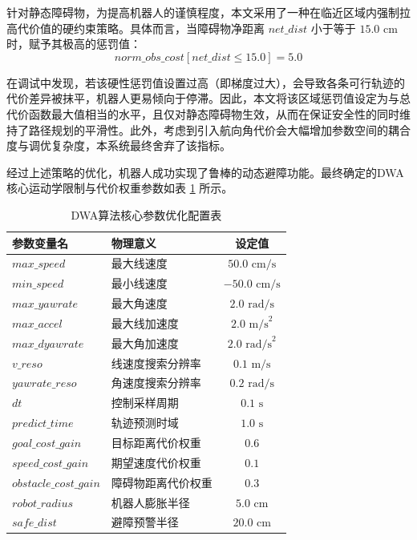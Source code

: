 \documentclass[
  oneside,
  degree=bachelor,
  fullwidthstop=false,
  fontset=fandol,
  times=false,
  minted=true,
  biblatex=true,
]{tongjithesis}
\begin{document}
针对静态障碍物，为提高机器人的谨慎程度，本文采用了一种在临近区域内强制拉高代价值的硬约束策略。具体而言，当障碍物净距离 $net\_dist$ 小于等于 $15.0\text{ cm}$ 时，赋予其极高的惩罚值：
\begin{equation}
norm\_obs\_cost[net\_dist \le 15.0] = 5.0
\end{equation}

在调试中发现，若该硬性惩罚值设置过高（即梯度过大），会导致各条可行轨迹的代价差异被抹平，机器人更易倾向于停滞。因此，本文将该区域惩罚值设定为与总代价函数最大值相当的水平，且仅对静态障碍物生效，从而在保证安全性的同时维持了路径规划的平滑性。此外，考虑到引入航向角代价会大幅增加参数空间的耦合度与调优复杂度，本系统最终舍弃了该指标。

经过上述策略的优化，机器人成功实现了鲁棒的动态避障功能。最终确定的DWA核心运动学限制与代价权重参数如表 \ref{tab:dwa_params} 所示。

\begin{table}[H]
    \centering
    \caption{DWA算法核心参数优化配置表}
    \label{tab:dwa_params}
    \begin{tabular}{llc}
        \toprule
        \textbf{参数变量名} & \textbf{物理意义} & \textbf{设定值} \\
        \midrule
        $max\_speed$ & 最大线速度 & $50.0 \text{ cm/s}$ \\
        $min\_speed$ & 最小线速度 & $-50.0 \text{ cm/s}$ \\
        $max\_yawrate$ & 最大角速度 & $2.0 \text{ rad/s}$ \\
        $max\_accel$ & 最大线加速度 & $2.0 \text{ m/s}^2$ \\
        $max\_dyawrate$ & 最大角加速度 & $2.0 \text{ rad/s}^2$ \\
        $v\_reso$ & 线速度搜索分辨率 & $0.1 \text{ m/s}$ \\
        $yawrate\_reso$ & 角速度搜索分辨率 & $0.2 \text{ rad/s}$ \\
        $dt$ & 控制采样周期 & $0.1 \text{ s}$ \\
        $predict\_time$ & 轨迹预测时域 & $1.0 \text{ s}$ \\
        $goal\_cost\_gain$ & 目标距离代价权重 & $0.6$ \\
        $speed\_cost\_gain$ & 期望速度代价权重 & $0.1$ \\
        $obstacle\_cost\_gain$ & 障碍物距离代价权重 & $0.3$ \\
        $robot\_radius$ & 机器人膨胀半径 & $5.0 \text{ cm}$ \\
        $safe\_dist$ & 避障预警半径 & $20.0 \text{ cm}$ \\
        \bottomrule
    \end{tabular}
\end{table}
\end{document}
